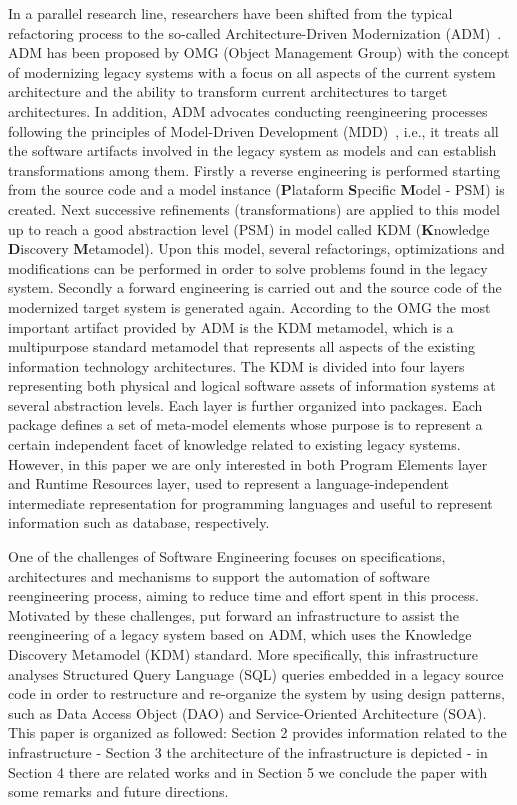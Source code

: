 In a parallel research line, researchers have been shifted from the typical refactoring process to the so-called Architecture-Driven Modernization (ADM)~\cite{Ulrich:2010}. ADM has been proposed by OMG (Object Management Group) with the concept of modernizing legacy systems with a focus on all aspects of the current system architecture and the ability to transform current architectures to target architectures. In addition, ADM advocates conducting reengineering processes following the principles of Model-Driven Development (MDD)~\cite{Ulrich:2010:IST:1841736}, i.e., it treats all the software artifacts involved in the legacy system as models and can establish transformations among them.  Firstly a reverse engineering is performed starting from the source code and a model instance (\textbf{P}lataform \textbf{S}pecific \textbf{M}odel - PSM) is created. Next successive refinements (transformations) are applied to this model up to reach a good abstraction level (PSM) in model called KDM (\textbf{K}nowledge \textbf{D}iscovery \textbf{M}etamodel). Upon this model, several refactorings, optimizations and modifications can be performed in order to solve problems found in the legacy system. Secondly a forward engineering is carried out and the source code of the modernized target system is generated again. According to the OMG the most important artifact provided by ADM is the KDM metamodel, which is a multipurpose standard metamodel that represents all aspects of the existing information  technology architectures. The KDM is divided into four layers representing both physical and logical software assets of information systems at several abstraction levels. Each layer is further organized into packages. Each package defines a set of meta-model elements whose purpose is to represent a certain independent facet of knowledge related to existing legacy systems.  However, in this paper we are only interested in both Program Elements layer and Runtime Resources layer, used to represent a language-independent intermediate representation for programming languages and useful to represent information such as database, respectively.

One of the challenges of Software Engineering focuses on specifications, architectures and mechanisms to support the automation of software reengineering process, aiming to reduce time and effort spent in this process.
 Motivated by these challenges, put forward an infrastructure to assist the reengineering of a legacy system based on ADM, which uses the Knowledge Discovery Metamodel (KDM) standard. 
More specifically, this infrastructure analyses Structured Query Language (SQL) queries embedded in a legacy source code in order to restructure and re-organize the system by using design patterns, such as Data Access Object (DAO) and Service-Oriented Architecture (SOA).  This paper is organized as followed: Section 2 provides information related to the infrastructure - Section 3 the architecture of the infrastructure is depicted - in Section 4 there are related works and in Section 5 we conclude the paper with some remarks and future directions.